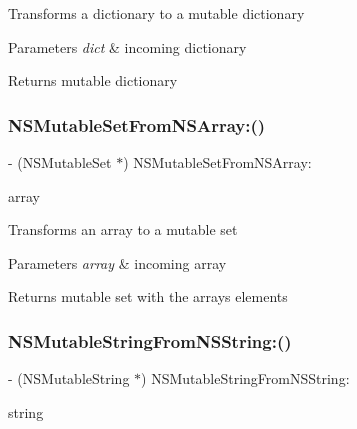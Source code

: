 Transforms a dictionary to a mutable dictionary 
\begin{DoxyParams}{Parameters}
{\em dict} & incoming dictionary \\
\hline
\end{DoxyParams}
\begin{DoxyReturn}{Returns}
mutable dictionary 
\end{DoxyReturn}
\mbox{\label{interface_o_p_t_l_y_j_s_o_n_value_transformer_a56e0e127329b6312a5e6b0fc7da5f921}} 
\subsubsection{\texorpdfstring{N\+S\+Mutable\+Set\+From\+N\+S\+Array\+:()}{NSMutableSetFromNSArray:()}}
{\footnotesize\ttfamily -\/ (N\+S\+Mutable\+Set $\ast$) N\+S\+Mutable\+Set\+From\+N\+S\+Array\+: \begin{DoxyParamCaption}\item[{(N\+S\+Array $\ast$)}]{array }\end{DoxyParamCaption}}

Transforms an array to a mutable set 
\begin{DoxyParams}{Parameters}
{\em array} & incoming array \\
\hline
\end{DoxyParams}
\begin{DoxyReturn}{Returns}
mutable set with the array\textquotesingle{}s elements 
\end{DoxyReturn}
\mbox{\label{interface_o_p_t_l_y_j_s_o_n_value_transformer_a43418fb2a9817c762bbcd026b9b1163c}} 
\subsubsection{\texorpdfstring{N\+S\+Mutable\+String\+From\+N\+S\+String\+:()}{NSMutableStringFromNSString:()}}
{\footnotesize\ttfamily -\/ (N\+S\+Mutable\+String $\ast$) N\+S\+Mutable\+String\+From\+N\+S\+String\+: \begin{DoxyParamCaption}\item[{(N\+S\+String $\ast$)}]{string }\end{DoxyParamCaption}}

